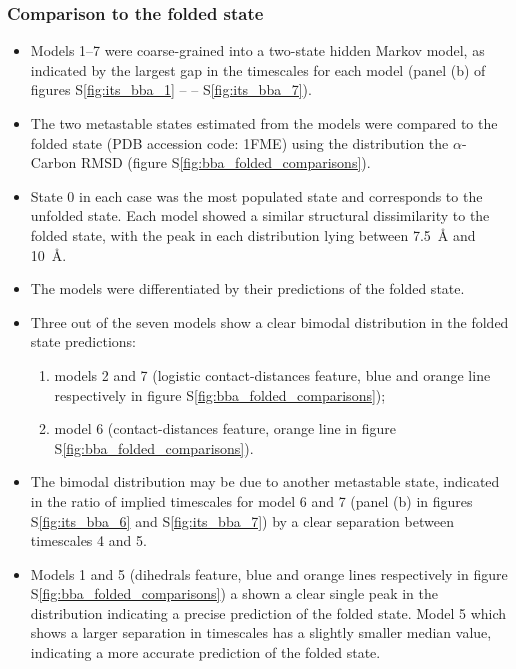 \documentclass[journal=jacsat,manuscript=article]{achemso}
\newcommand*\sref[1]{%
    S\ref{#1}}
\begin{document}
\subsubsection{Comparison to the folded state}

\begin{itemize}
    \item Models \numrange{1}{7} were coarse-grained into a two-state hidden Markov model, as indicated by the largest gap in the timescales for each model (panel (b)  of figures \sref{fig:its_bba_1} --  -- \sref{fig:its_bba_7}).
    \item The two metastable states estimated from the models were compared to the folded state (PDB accession code: 1FME) using the distribution the $\alpha$-Carbon RMSD (figure \sref{fig:bba_folded_comparisons}).  
    \item State 0 in each case was the most populated state and corresponds to the unfolded state. Each model showed a similar structural dissimilarity to the folded state, with the peak in each distribution lying between \SI{7.5}{\angstrom} and \SI{10}{\angstrom}.  
    \item The models were differentiated by their predictions of the folded state. 
    \item Three out of the seven models show a clear bimodal distribution in the folded state predictions: 
        \begin{enumerate}
            \item models 2 and 7 (logistic contact-distances feature, blue and orange line respectively in figure \sref{fig:bba_folded_comparisons}); 
            \item model 6  (contact-distances feature, orange line in figure \sref{fig:bba_folded_comparisons}). 
        \end{enumerate}
    \item The bimodal distribution may be due to another metastable state, indicated in the ratio of implied timescales for model 6 and 7 (panel (b) in figures \sref{fig:its_bba_6} and \sref{fig:its_bba_7}) by a clear separation between timescales 4 and 5.  
    \item Models 1 and 5 (dihedrals feature, blue and orange lines respectively in figure \sref{fig:bba_folded_comparisons}) a shown a clear single peak in the distribution indicating a precise prediction of the folded state. Model 5 which shows a larger separation in timescales has a slightly smaller median value, indicating a more accurate prediction of the folded state.  
\end{itemize}
\end{document}
